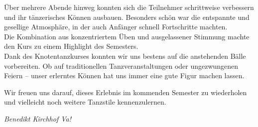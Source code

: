 \begin{multicols}{2}
Über mehrere Abende hinweg konnten sich die Teilnehmer schrittweise verbessern
und ihr tänzerisches Können ausbauen. Besonders schön war die entspannte und
gesellige Atmosphäre, in der auch Anfänger schnell Fortschritte machten.\\
Die Kombination aus konzentriertem Üben und ausgelassener Stimmung machte den
Kurs zu einem Highlight des Semesters.\\
Dank des Knotentanzkurses konnten wir uns bestens auf die anstehenden Bälle
vorbereiten. Ob auf traditionellen Tanzveranstaltungen oder ungezwungenen
Feiern – unser erlerntes Können hat uns immer eine gute Figur machen lassen.

Wir freuen uns darauf, dieses Erlebnis im kommenden Semester zu wiederholen und
vielleicht noch weitere Tanzstile kennenzulernen.

	\begin{flushright}
		\hfill\emph{Benedikt Kirchhof Va!}
	\end{flushright}
\end{multicols}


